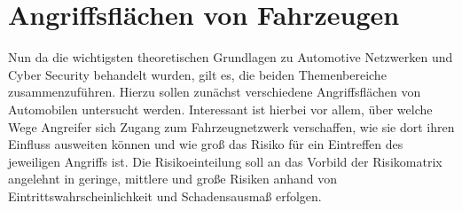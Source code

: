 






\chapter{Angriffsflächen von Fahrzeugen}
Nun da die wichtigsten theoretischen Grundlagen zu Automotive Netzwerken und Cyber Security behandelt wurden, gilt es, die beiden Themenbereiche zusammenzuführen. Hierzu sollen zunächst verschiedene Angriffsflächen von Automobilen untersucht werden. Interessant ist hierbei vor allem, über welche Wege Angreifer sich Zugang zum Fahrzeugnetzwerk verschaffen, wie sie dort ihren Einfluss ausweiten können und wie groß das Risiko für ein Eintreffen des jeweiligen Angriffs ist. Die Risikoeinteilung soll an das Vorbild der Risikomatrix angelehnt in geringe, mittlere und große Risiken anhand von Eintrittswahrscheinlichkeit und Schadensausmaß erfolgen.



